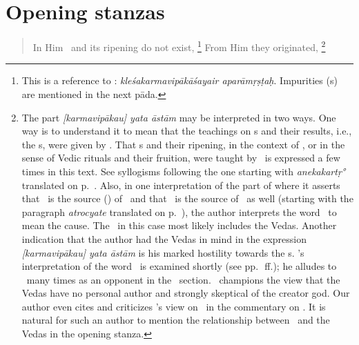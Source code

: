\section{Opening stanzas}
\begin{verse}
  In%
 Him \karman\ and its ripening do not exist,%
  \footnote{\label{NONFSFP}This is a reference to : \emph{kleśakarmavipākāśayair aparāmṛṣṭaḥ}.  Impurities (\klesa\/s) are mentioned in the next pāda.%
  }
  From Him they originated,%
  \footnote{%
	The part \emph{[karmavipākau] yata āstām} may be interpreted in two ways.  One way is to understand it to mean that the teachings on \karman\/s and their results, i.e., the \Veda s, were given by \Isvara.  That \karman\/s and their ripening, in the context of \dharma, or in the sense of Vedic rituals and their fruition, were taught by \Isvara\ is expressed a few times in this text.  See syllogisms following the one starting with \emph{anekakartṛ\/°}  translated on p.~\pageref{VRNASRM25}.  Also, in one interpretation of the part of  where it asserts that \Isvara\ is the source (\nimitta) of \sastra\ and that \sastra\ is the source of \Isvara\ as well (starting with the paragraph \emph{atro\-cyate}  translated on p.~\pageref{SSTRISVR24}), the author interprets the word \nimitta\ to mean the cause.  The \sastra\ in this case most likely includes the Vedas.  Another indication that the author had the Vedas in mind in the expression \emph{[karmavipākau] yata āstām} is his marked hostility towards the \Mimamsaka s. \Sabara's interpretation of the word \atha\ is examined shortly (see pp.~\pageref{SBRATH}\,ff.);  he alludes to \Kumarila\ many times as an opponent in the \Isvara\ section. \Kumarila\ champions the view that the Vedas have no personal author and strongly skeptical of the creator god.  Our author even cites and criticizes \Kumarila's view on \sphota\ in the commentary on . It is natural for such an author to mention the relationship between \Isvara\ and the Vedas in the opening stanza.%

}
\end{verse}
